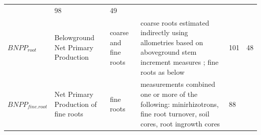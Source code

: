 \documentclass[]{article}
\begin{document}
\begin{longtable}[]{@{}llllll@{}}
\begin{minipage}[t]{0.23\columnwidth}
\end{minipage} & \begin{minipage}[t]{0.07\columnwidth}\raggedright\strut
98\strut
\end{minipage} & \begin{minipage}[t]{0.07\columnwidth}\raggedright\strut
49\strut
\end{minipage}\tabularnewline
\begin{minipage}[t]{0.14\columnwidth}\raggedright\strut
\(BNPP_{root}\)\strut
\end{minipage} & \begin{minipage}[t]{0.19\columnwidth}\raggedright\strut
Belowground Net Primary Production\strut
\end{minipage} & \begin{minipage}[t]{0.13\columnwidth}\raggedright\strut
coarse and fine roots\strut
\end{minipage} & \begin{minipage}[t]{0.23\columnwidth}\raggedright\strut
coarse roots estimated indirectly using allometries based on aboveground
stem increment measures ; fine roots as below\strut
\end{minipage} & \begin{minipage}[t]{0.07\columnwidth}\raggedright\strut
101\strut
\end{minipage} & \begin{minipage}[t]{0.07\columnwidth}\raggedright\strut
48\strut
\end{minipage}\tabularnewline
\begin{minipage}[t]{0.14\columnwidth}\raggedright\strut
\(BNPP_{fine.root}\)\strut
\end{minipage} & \begin{minipage}[t]{0.19\columnwidth}\raggedright\strut
Net Primary Production of fine roots\strut
\end{minipage} & \begin{minipage}[t]{0.13\columnwidth}\raggedright\strut
fine roots\strut
\end{minipage} & \begin{minipage}[t]{0.23\columnwidth}\raggedright\strut
measurements combined one or more of the following: minirhizotrons, fine
root turnover, soil cores, root ingrowth cores\strut
\end{minipage} & \begin{minipage}[t]{0.07\columnwidth}\raggedright\strut
88\strut
\end{minipage} & \begin{minipage}[t]{0.07\columnwidth}\raggedright\strut

\end{minipage}
\end{longtable}
\end{document}
